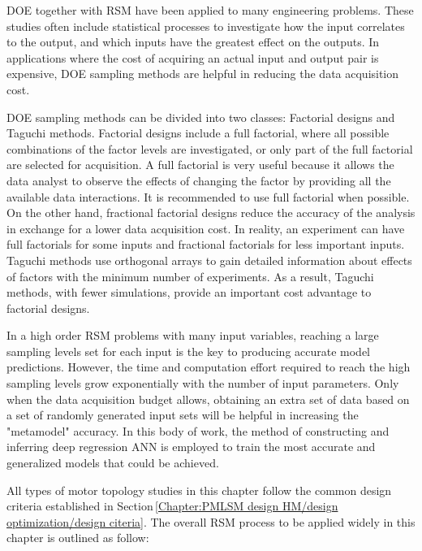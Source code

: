     
        \acf{DOE} together with \ac{RSM} have been applied to many engineering problems. These studies often include statistical processes to investigate how the input correlates to the output, and which inputs have the greatest effect on the outputs. In applications where the cost of acquiring an actual input and output pair is expensive, \ac{DOE} sampling methods are helpful in reducing the data acquisition cost. 
        
        
        \ac{DOE} sampling methods can be divided into two classes: Factorial designs and Taguchi methods. Factorial designs include a full factorial, where all possible combinations of the factor levels are investigated, or only part of the full factorial are selected for acquisition. A full factorial is very useful because it allows the data analyst to observe the effects of changing the factor by providing all the available data interactions. It is recommended to use full factorial when possible. On the other hand, fractional factorial designs reduce the accuracy of the analysis in exchange for a lower data acquisition cost. In reality, an experiment can have full factorials for some inputs and fractional factorials for less important inputs. Taguchi methods use orthogonal arrays to gain detailed information about effects of factors with the minimum number of experiments. As a result, Taguchi methods, with fewer simulations, provide an important cost advantage to factorial designs. 
        
        
        In a high order \ac{RSM} problems with many input variables, reaching a large sampling levels set for each input is the key to producing accurate model predictions. However, the time and computation effort required to reach the high sampling levels grow exponentially with the number of input parameters. Only when the data acquisition budget allows, obtaining an extra set of data based on a set of randomly generated input sets will be helpful in increasing the "metamodel" accuracy. In this body of work, the method of constructing and inferring deep regression \acf{ANN} is employed to train the most accurate and generalized models that could be achieved.
        
        
        All types of motor topology studies in this chapter follow the common design criteria established in Section\,\ref{Chapter:PMLSM design HM/design optimization/design citeria}. The overall \ac{RSM} process to be applied widely in this chapter is outlined as follow:
        
